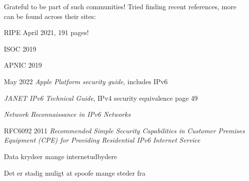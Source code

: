 \documentclass[Screen16to9,17pt]{foils}
\begin{document}
Grateful to be part of such communities! Tried finding recent references, more can be found across their sites:
\begin{list2}
\item RIPE April 2021, 191 pages!\\

\item ISOC 2019

\item APNIC 2019


\item May 2022 \emph{Apple Platform security guide}, includes IPv6\\

\item \emph{JANET IPv6 Technical Guide}, IPv4 security equivalence page 49\\

\item \emph{Network Reconnaissance in IPv6 Networks} 

\item RFC6092 2011 \emph{Recommended Simple Security Capabilities in Customer Premises Equipment (CPE) for Providing Residential IPv6 Internet Service}\\
\end{list2}




\begin{list2}
\item Data krydser mange internetudbydere
\item Det er stadig muligt at spoofe mange steder fra
\end{list2}


\end{document}
